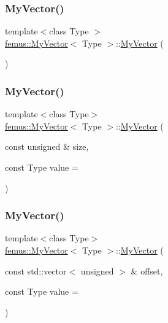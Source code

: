 \subsubsection{\texorpdfstring{My\+Vector()}{MyVector()}\hspace{0.1cm}{\footnotesize\ttfamily [1/3]}}
{\footnotesize\ttfamily template$<$class Type $>$ \\
\mbox{\hyperlink{classfemus_1_1_my_vector}{femus\+::\+My\+Vector}}$<$ Type $>$\+::\mbox{\hyperlink{classfemus_1_1_my_vector}{My\+Vector}} (\begin{DoxyParamCaption}{ }\end{DoxyParamCaption})}

\mbox{\label{classfemus_1_1_my_vector_a8ba1201c2e7bc237b58487190b341362}} 
\subsubsection{\texorpdfstring{My\+Vector()}{MyVector()}\hspace{0.1cm}{\footnotesize\ttfamily [2/3]}}
{\footnotesize\ttfamily template$<$class Type$>$ \\
\mbox{\hyperlink{classfemus_1_1_my_vector}{femus\+::\+My\+Vector}}$<$ Type $>$\+::\mbox{\hyperlink{classfemus_1_1_my_vector}{My\+Vector}} (\begin{DoxyParamCaption}\item[{const unsigned \&}]{size,  }\item[{const Type}]{value = {} }\end{DoxyParamCaption})}

\mbox{\label{classfemus_1_1_my_vector_a3ed238cfe3bceb16b6c94fa2a9a6a79c}} 
\subsubsection{\texorpdfstring{My\+Vector()}{MyVector()}\hspace{0.1cm}{\footnotesize\ttfamily [3/3]}}
{\footnotesize\ttfamily template$<$class Type$>$ \\
\mbox{\hyperlink{classfemus_1_1_my_vector}{femus\+::\+My\+Vector}}$<$ Type $>$\+::\mbox{\hyperlink{classfemus_1_1_my_vector}{My\+Vector}} (\begin{DoxyParamCaption}\item[{const std\+::vector$<$ unsigned $>$ \&}]{offset,  }\item[{const Type}]{value = {} }\end{DoxyParamCaption})}

